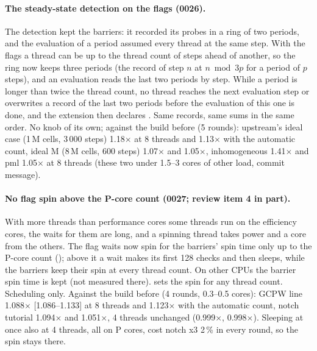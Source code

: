 \paragraph{The steady-state detection on the flags (0026).} The detection kept the barriers: it recorded its probes in a
ring of two periods, and the evaluation of a period assumed every thread at the same step. With the flags a thread can
be up to the thread count of steps ahead of another, so the ring now keeps three periods (the record of step $n$ at
$n \bmod 3p$ for a period of $p$ steps), and an evaluation reads the last two periods by step. While a period is
longer than twice the thread count, no thread reaches the next evaluation step or overwrites a record of the last two
periods before the evaluation of this one is done, and the extension then declares . Same records, same
sums in the same order. No knob of its own; against the build before (5 rounds): upstream's ideal case (1\,M cells,
3\,000 steps) 1.18$\times$ at 8 threads and 1.13$\times$ with the automatic count, ideal M (8\,M cells, 600 steps)
1.07$\times$ and 1.05$\times$, inhomogeneous 1.41$\times$ and pml 1.05$\times$ at 8 threads (these two under 1.5--3
cores of other load, commit message).

\paragraph{No flag spin above the P-core count (0027; review item 4 in part).} With more threads than performance
cores some threads run on the efficiency cores, the waits for them are long, and a spinning thread takes power and a
core from the others. The flag waits now spin for the barriers' spin time only up to the P-core count
(); above it a wait makes its first 128 checks and then sleeps, while the barriers
keep their spin at every thread count. On other CPUs the
barrier spin time is kept (not measured there).  sets the spin for any thread count.
Scheduling only. Against the build before (4 rounds, 0.3--0.5 cores): GCPW line 1.088$\times$ [1.086--1.133] at 8
threads and 1.123$\times$ with the automatic count, notch tutorial 1.094$\times$ and 1.051$\times$, 4 threads unchanged
(0.999$\times$, 0.998$\times$). Sleeping at once also at 4 threads, all on P cores, cost notch x3 2\,\% in every
round, so the spin stays there.

